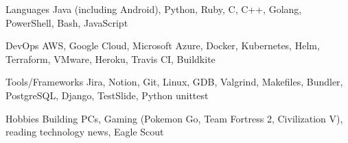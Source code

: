 

\begin{cvskills}


  \cvskill
    {Languages} %
    {Java (including Android), Python, Ruby, C, C++, Golang, PowerShell, Bash, JavaScript} %

  \cvskill
    {DevOps} %
    {AWS, Google Cloud, Microsoft Azure, Docker, Kubernetes, Helm, Terraform, VMware, Heroku, Travis CI, Buildkite} %
    
  \cvskill
    {Tools/Frameworks} %
    {Jira, Notion, Git, Linux, GDB, Valgrind, Makefiles, Bundler, PostgreSQL, Django, TestSlide, Python unittest} %

  \cvskill
  {Hobbies} %
  {Building PCs, Gaming (Pokemon Go, Team Fortress 2, Civilization V), reading technology news, Eagle Scout} %

\end{cvskills}
